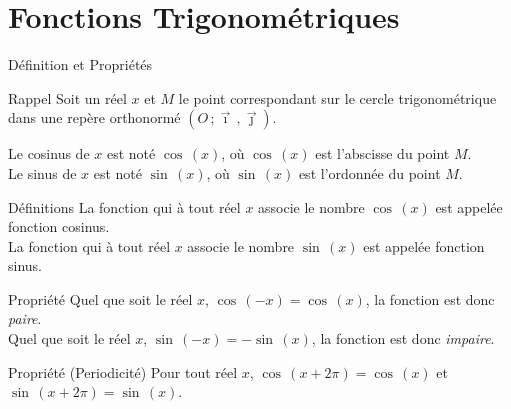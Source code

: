 \documentclass{coursbook}
\begin{document}
    \chapter{Fonctions Trigonométriques}

    \begin{Gpartie}{Définition et Propriétés} 
        \begin{Spartie}{Rappel} 
            Soit un réel $x$ et $M$ le point correspondant sur le cercle trigonométrique dans une repère orthonormé $\left(O\,; \vec{\imath}\,, \vec{\jmath}\right)$.

            Le cosinus de $x$ est noté $\cos\,(x)$, où $\cos\,(x)$ est l'abscisse du point $M$. \\
            Le sinus de $x$ est noté $\sin\,(x)$, où $\sin\,(x)$ est l'ordonnée du point $M$.
            
            \begin{center}
                \parbox{\linewidth}{}
            \end{center}
        \end{Spartie}
        \begin{Spartie}{Définitions} 
            La fonction qui à tout réel $x$ associe le nombre $\cos\,(x)$ est appelée fonction cosinus. \\
            La fonction qui à tout réel $x$ associe le nombre $\sin\,(x)$ est appelée fonction sinus.
        \end{Spartie}
        \begin{Spartie}{Propriété} 
            Quel que soit le réel $x$, $\cos\,(-x)=\cos\,(x)$, la fonction est donc \emph{paire}. \\
            Quel que soit le réel $x$, $\sin\,(-x)=-\sin\,(x)$, la fonction est donc \emph{impaire}.
        \end{Spartie}
        \begin{Spartie}{Propriété (Periodicité)} 
            Pour tout réel $x$, $\cos\,(x+2\pi)=\cos\,(x)$ et $\sin\,(x+2\pi)=\sin\,(x)$.


\end{Spartie}
\end{Gpartie}
\end{document}
